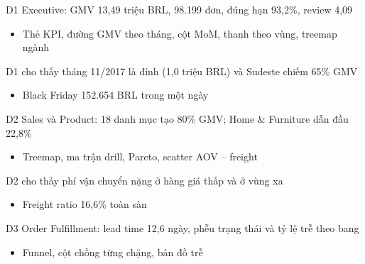 \begin{frame}{D1 Executive: GMV 13,49 triệu BRL, 98.199 đơn, đúng hạn 93,2\%, review 4,09}
\begin{itemize}
  \item Thẻ KPI, đường GMV theo tháng, cột MoM, thanh theo vùng, treemap ngành
\end{itemize}

\end{frame}

\begin{frame}{D1 cho thấy tháng 11/2017 là đỉnh (1,0 triệu BRL) và Sudeste chiếm 65\% GMV}
\begin{itemize}
  \item Black Friday 152.654 BRL trong một ngày
\end{itemize}

\end{frame}

\begin{frame}{D2 Sales và Product: 18 danh mục tạo 80\% GMV; Home \& Furniture dẫn đầu 22,8\%}
\begin{itemize}
  \item Treemap, ma trận drill, Pareto, scatter AOV – freight
\end{itemize}

\end{frame}

\begin{frame}{D2 cho thấy phí vận chuyển nặng ở hàng giá thấp và ở vùng xa}
\begin{itemize}
  \item Freight ratio 16,6\% toàn sàn
\end{itemize}

\end{frame}

\begin{frame}{D3 Order Fulfillment: lead time 12,6 ngày, phễu trạng thái và tỷ lệ trễ theo bang}
\begin{itemize}
  \item Funnel, cột chồng từng chặng, bản đồ trễ
\end{itemize}

\end{frame}

